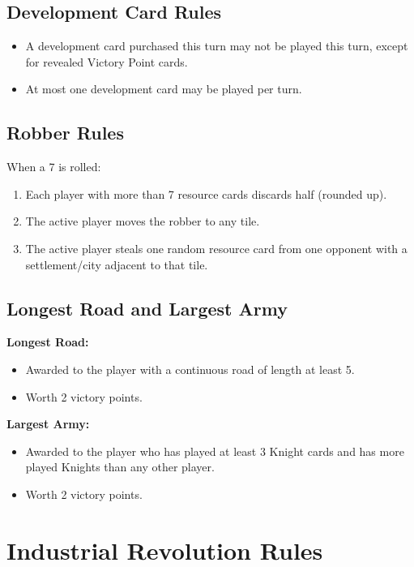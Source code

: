 \documentclass[12pt]{report}
\begin{document}
\section{Development Card Rules}
\begin{itemize}[leftmargin=1.2cm]
  \item A development card purchased this turn may not be played this turn, except for revealed Victory Point cards.
  \item At most one development card may be played per turn.
\end{itemize}

\section{Robber Rules}
When a 7 is rolled:
\begin{enumerate}[leftmargin=1.2cm]
  \item Each player with more than 7 resource cards discards half (rounded up).
  \item The active player moves the robber to any tile.
  \item The active player steals one random resource card from one opponent with a settlement/city adjacent to that tile.
\end{enumerate}

\section{Longest Road and Largest Army}
\textbf{Longest Road:}
\begin{itemize}[leftmargin=1.2cm]
  \item Awarded to the player with a continuous road of length at least 5.
  \item Worth 2 victory points.
\end{itemize}

\textbf{Largest Army:}
\begin{itemize}[leftmargin=1.2cm]
  \item Awarded to the player who has played at least 3 Knight cards and has more played Knights than any other player.
  \item Worth 2 victory points.
\end{itemize}

\chapter{Industrial Revolution Rules}
\end{document}
